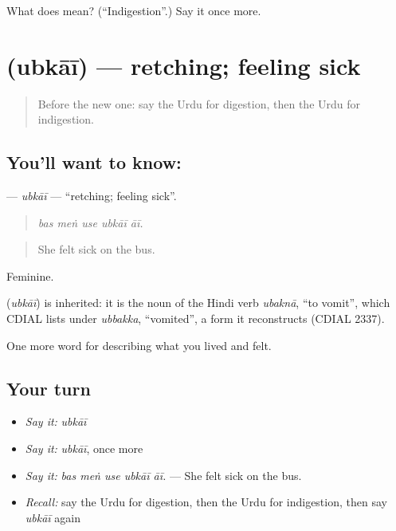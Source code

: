 \begin{tcolorbox}[breakable,colback=teal!4,colframe=teal!35!black,title={Before you move on}]
What does  mean? (\textquotedblleft{}Indigestion\textquotedblright{}.) Say it once more.
\end{tcolorbox}
\section[\texorpdfstring{\ur{ابکائی} (ubkāī)}{ابکائی (ubkāī)}]{ (ubkāī) — retching; feeling sick}

\label{lesson:UR-C472-ubkai}



\begin{quote}
Before the new one: say the Urdu for digestion, then the Urdu for indigestion.
\end{quote}

\subsection*{You'll want to know: }
\textbf{} — \emph{ubkāī} — \textquotedblleft{}retching; feeling sick\textquotedblright{}.

\begin{quote}
    
\end{quote}

\begin{quote}
\emph{bas meṅ use ubkāī āī.}
\end{quote}

\begin{quote}
She felt sick on the bus.
\end{quote}

Feminine.

\begin{cousinweb}
\textbf{} (\emph{ubkāī}) is inherited: it is the noun of the Hindi verb \emph{ubaknā}, \textquotedblleft{}to vomit\textquotedblright{}, which CDIAL lists under \emph{ubbakka}, \textquotedblleft{}vomited\textquotedblright{}, a form it reconstructs (CDIAL 2337).
\end{cousinweb}

\begin{grammarlens}[title={What you've built}]
One more word for describing what you lived and felt.
\end{grammarlens}

\subsection*{Your turn}
\begin{itemize}
\raggedright
  \item \emph{Say it:} \emph{ubkāī}
  \item \emph{Say it:} \emph{ubkāī}, once more
  \item \emph{Say it:} \emph{bas meṅ use ubkāī āī.} — She felt sick on the bus.
  \item \emph{Recall:} say the Urdu for digestion, then the Urdu for indigestion, then say \emph{ubkāī} again
\end{itemize}

